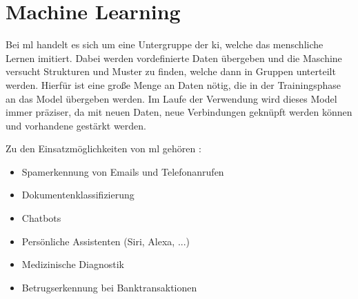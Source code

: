 \section{Machine Learning}

Bei \gls{ml} handelt es sich um eine Untergruppe der \gls{ki}, welche das menschliche Lernen imitiert. Dabei werden vordefinierte Daten übergeben und die Maschine versucht Strukturen und Muster zu finden, welche dann in Gruppen unterteilt werden. Hierfür ist eine große Menge an Daten nötig, die in der Trainingsphase an das Model übergeben werden. Im Laufe der Verwendung wird dieses Model immer präziser, da mit neuen Daten, neue Verbindungen geknüpft werden können und vorhandene gestärkt werden. 

Zu den Einsatzmöglichkeiten von \gls{ml} gehören \cite{MLU}:

\begin{itemize}
    \item Spamerkennung von Emails und Telefonanrufen
    \item Dokumentenklassifizierung
    \item Chatbots
    \item Persönliche Assistenten (Siri, Alexa, ...)
    \item Medizinische Diagnostik
    \item Betrugserkennung bei Banktransaktionen
\end{itemize}







